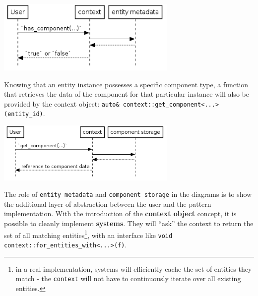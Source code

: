 \documentclass[twoside, 12pt, a4paper, openright]{book}
\let\origfigure=\figure
\let\endorigfigure=\endfigure
\renewenvironment{figure}[1][]{%
\origfigure[H]
}{%
\endorigfigure
}
\begin{document}
\begin{figure}[htbp]
\centering
\includegraphics[width=0.65000\textwidth]{source/figures/generated/ecs/overview/dod_composition/uml_context_has_component.png}
\caption{DOD: checking component type availability through context
object}
\end{figure}

Knowing that an entity instance possesses a specific component type, a
function that retrieves the data of the component for that particular
instance will also be provided by the context object:
\texttt{auto& context::get_component<...>(entity_id)}.

\begin{figure}[htbp]
\centering
\includegraphics[width=0.65000\textwidth]{source/figures/generated/ecs/overview/dod_composition/uml_context_get_component.png}
\caption{DOD: getting component instance data through context object}
\end{figure}

The role of
\texttt{entity metadata}
and
\texttt{component storage}
in the diagrams is to show the additional layer of abstraction between
the user and the pattern implementation. With the introduction of the
\textbf{context object} concept, it is possible to cleanly implement
\textbf{systems}. They will ``ask'' the context to return the set of all
matching entities\footnote{in a real implementation, systems will
  efficiently cache the set of entities they match - the
  \texttt{context}
  will not have to continuously iterate over all existing entities.},
with an interface like
\texttt{void context::for_entities_with<...>(f)}.
\end{document}
